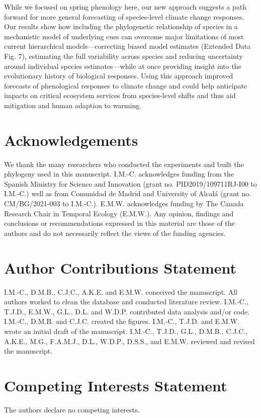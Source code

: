 \documentclass[11pt]{article}
\begin{document}
\par While we focused on spring phenology here, our new approach suggests a path forward for more general forecasting of species-level climate change responses. Our results show how including the phylogenetic relationship of species in a mechanistic model of underlying cues can overcome major limitations of most current hierarchical models---correcting biased model estimates (Extended Data Fig. 7), estimating the full variability across species and reducing uncertainty around individual species estimates---while at once providing insight into the evolutionary history of biological responses. Using this approach improved forecasts of phenological responses to climate change and could help anticipate impacts on critical ecosystem services from species-level shifts and thus aid mitigation and human adaption to warming.


\section*{Acknowledgements}
We thank the many researchers who conducted the experiments and built the phylogeny used in this manuscript. I.M.-C. acknowledges funding from the Spanish Ministry for Science and Innovation (grant no. PID2019/109711RJ-I00 to I.M.-C.) well as from Comunidad de Madrid and University of Alcal\'a (grant no. CM/BG/2021-003 to I.M.-C.). E.M.W. acknowledges funding by The Canada Research Chair in Temporal Ecology (E.M.W.). Any opinion, findings and conclusions or recommendations expressed in this material are those of the authors and do not necessarily reflect the views of the funding agencies.

\section*{Author Contributions Statement}
I.M.-C., D.M.B., C.J.C., A.K.E. and E.M.W. conceived the manuscript. All authors worked to clean the database and conducted literature review. I.M.-C., T.J.D., E.M.W., G.L., D.L. and W.D.P. contributed data analysis and/or code. I.M.-C., D.M.B. and C.J.C. created the figures. I.M.-C., T.J.D. and E.M.W. wrote an initial draft of the manuscript. I.M.-C., T.J.D., G.L., D.M.B., C.J.C., A.K.E., M.G., F.A.M.J., D.L., W.D.P., D.S.S., and E.M.W. reviewed and revised the manuscript.

\section*{Competing Interests Statement}
The authors declare no competing interests.
\clearpage
\end{document}

